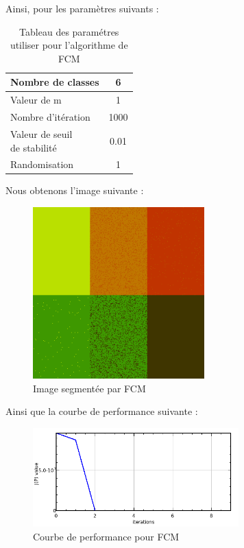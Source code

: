 \documentclass[a4paper,11pt]{article}
\begin{document}
Ainsi, pour les paramètres suivants : 

\begin{table}[H]
  \begin{center}
    \begin{tabular}{|l|c|}
      \hline
      Nombre de classes & 6 \\
      \hline
      Valeur de m & 1 \\
      \hline
      Nombre d'itération & 1000 \\
      \hline
      \shortstack{ Valeur de seuil \\ de stabilité }  & 0.01 \\
      \hline
      Randomisation & 1 \\
      \hline
    \end{tabular}
    \caption{Tableau des paramétres utiliser pour l'algorithme de FCM}
  \end{center}
\end{table}

Nous obtenons l'image suivante :

\begin{figure}[H]
\begin{center}
\includegraphics[width=250px]{../img/FCM.png}
\end{center}
\caption{Image segmentée par FCM}
\end{figure}

Ainsi que la courbe de performance suivante :

\begin{figure}[H]
\begin{center}
\includegraphics[width=300px]{../img/Perf_FCM.png}
\end{center}
\caption{Courbe de performance pour FCM}
\end{figure}
\end{document}
